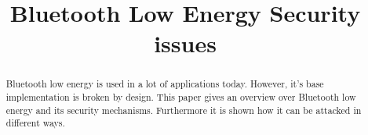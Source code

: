 \documentclass[conference]{IEEEtran}
\begin{document}
%
\title{Bluetooth Low Energy {\textendash} Security issues}


\author{
}


%








\maketitle


\begin{abstract}
Bluetooth low energy is used in a lot of applications today. However, it's base 
implementation is broken by design. This paper gives an overview over Bluetooth 
low energy and its security mechanisms. Furthermore it is shown how it can be 
attacked in different ways.
\end{abstract}
\end{document}
